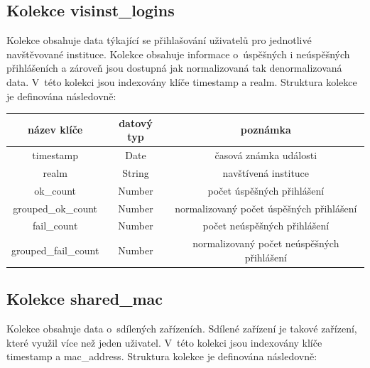 \documentclass[thesis=M,czech]{FITthesis}[2012/06/26]
\begin{document}
    \subsection{Kolekce visinst\_logins}
    
      Kolekce obsahuje data týkající se přihlašování uživatelů pro jednotlivé navštěvované instituce.
      Kolekce obsahuje informace o~úspěšných i neúspěšných přihlášeních
      a zároveň jsou dostupná jak normalizovaná tak denormalizovaná data.
      V~této kolekci jsou indexovány klíče timestamp a realm.
      Struktura kolekce je definována následovně:
      
      \begin{center}
        \begin{tabular}{ | c | c | c | }
          \hline
            název klíče          & datový typ & poznámka                                   \\ \hline
            timestamp            & Date       & časová známka události                     \\ \hline
            realm                & String     & navštívená instituce                       \\ \hline
            ok\_count            & Number     & počet úspěšných přihlášení                 \\ \hline
            grouped\_ok\_count   & Number     & normalizovaný počet úspěšných přihlášení   \\ \hline
            fail\_count          & Number     & počet neúspěšných přihlášení               \\ \hline
            grouped\_fail\_count & Number     & normalizovaný počet neúspěšných přihlášení \\
          \hline
        \end{tabular}
      \end{center}

    \subsection{Kolekce shared\_mac}
    
      Kolekce obsahuje data o~sdílených zařízeních.
      Sdílené zařízení je takové zařízení, které využil více než jeden uživatel.
      V~této kolekci jsou indexovány klíče timestamp a mac\_address.
      Struktura kolekce je definována následovně:
      
\end{document}
